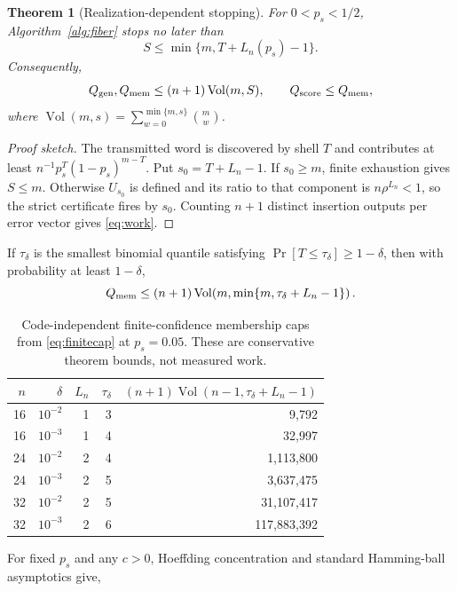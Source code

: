 \documentclass[conference]{IEEEtran}
\newtheorem{theorem}{Theorem}
\newcommand{\Vol}{\operatorname{Vol}}
\begin{document}
\begin{theorem}[Realization-dependent stopping]\label{thm:stop}
For $0<p_s<1/2$, Algorithm~\ref{alg:fiber} stops no later than
\begin{equation}
 S\le \min\{m,T+L_n(p_s)-1\}. \label{eq:stop}
\end{equation}
Consequently,
\begin{equation}
 Q_{\rm gen},Q_{\rm mem}\le(n+1)\Vol(m,S),\qquad Q_{\rm score}\le Q_{\rm mem}, \label{eq:work}
\end{equation}
where $\Vol(m,s)=\sum_{w=0}^{\min\{m,s\}}\binom mw$.
\end{theorem}
\begin{proof}[Proof sketch]
The transmitted word is discovered by shell $T$ and contributes at least
$n^{-1}p_s^T(1-p_s)^{m-T}$. Put $s_0=T+L_n-1$. If $s_0\ge m$, finite exhaustion gives
$S\le m$. Otherwise $U_{s_0}$ is defined and its ratio to that component is
$n\rho^{L_n}<1$, so the strict certificate fires by $s_0$. Counting $n+1$ distinct insertion
outputs per error vector gives \eqref{eq:work}.
\end{proof}
If $\tau_\delta$ is the smallest binomial quantile satisfying
$\Pr[T\le\tau_\delta]\ge1-\delta$, then with probability at least $1-\delta$,
\begin{equation}
 Q_{\rm mem}\le(n+1)\Vol\!\left(m,\min\{m,\tau_\delta+L_n-1\}\right). \label{eq:finitecap}
\end{equation}
\begin{table}[t]
\caption{Code-independent finite-confidence membership caps from \eqref{eq:finitecap} at $p_s=0.05$. These are conservative theorem bounds, not measured work.}
\label{tab:caps}
\centering\footnotesize
\setlength{\tabcolsep}{10pt}\renewcommand{\arraystretch}{1.05}
\begin{tabular}{@{}rrrrr@{}}
\toprule
$n$ & $\delta$ & $L_n$ & $\tau_\delta$ & $(n+1)\Vol(n-1,\tau_\delta+L_n-1)$\\
\midrule
16 & $10^{-2}$ & 1 & 3 & 9,792\\
16 & $10^{-3}$ & 1 & 4 & 32,997\\
24 & $10^{-2}$ & 2 & 4 & 1,113,800\\
24 & $10^{-3}$ & 2 & 5 & 3,637,475\\
32 & $10^{-2}$ & 2 & 5 & 31,107,417\\
32 & $10^{-3}$ & 2 & 6 & 117,883,392\\
\bottomrule
\end{tabular}
\end{table}
For fixed $p_s$ and any $c>0$, Hoeffding concentration and standard Hamming-ball asymptotics give,
\end{document}
